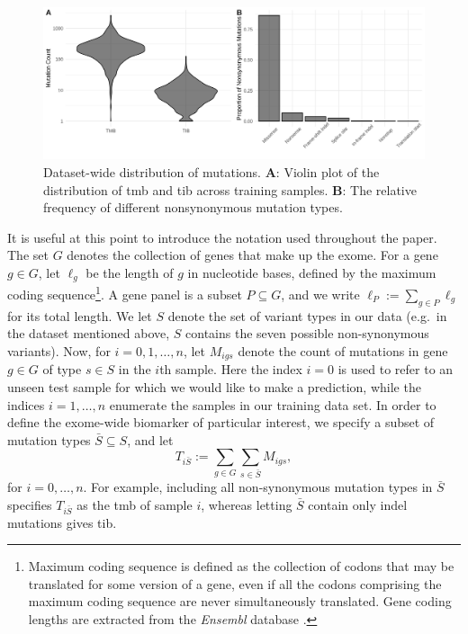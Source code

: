 \documentclass[12pt]{article}
\begin{document}
\begin{figure}[htbp]
\centering
\includegraphics[width=6in]{figures/fig2.png}
\vspace*{-5mm}
\caption{ Dataset-wide distribution of mutations. \textbf{A}: Violin plot of the distribution of \acrshort{tmb} and \acrshort{tib} across training samples. \textbf{B}: The relative frequency of different nonsynonymous mutation types. \label{fig:2}}
\vspace*{-2mm}
\end{figure}

It is useful at this point to introduce the notation used throughout the paper. The set $G$ denotes the collection of genes that make up the exome. For a gene $g \in G$, let $\ell_g$ be the length of $g$ in nucleotide bases, defined by the maximum coding sequence\footnote{Maximum coding sequence is defined as the collection of codons that may be translated for some version of a gene, even if all the codons comprising the maximum coding sequence are never simultaneously translated. Gene coding lengths are extracted from the \emph{Ensembl} database \citep{yates_ensembl_2020}.}.  A gene panel is a subset $P \subseteq G$, and we write $\ell_P := \sum_{g \in P} \ell_g$ for its total length. We let $S$ denote the set of variant types in our data (e.g.~in the dataset mentioned above, $S$ contains the seven possible non-synonymous variants). Now, for $i = 0, 1, \ldots, n$, let $M_{igs}$ denote the count of mutations in gene $g \in G$ of type $s \in S$ in the $i$th sample. Here the index $i=0$ is used to refer to an unseen test sample for which we would like to make a prediction, while the indices $i=1,\ldots,n$ enumerate the samples in our training data set.  In order to define the exome-wide biomarker of particular interest, we specify a subset of mutation types $\bar{S} \subseteq S$, and let
\begin{equation}
T_{i\bar{S}} := \sum_{g \in G} \sum_{s \in \bar{S}} M_{igs},
\label{eq:biomarker}
\end{equation}
for $i=0,\ldots, n$.
% 
For example, including all non-synonymous mutation types in $\bar{S}$ specifies $T_{i\bar{S}}$ as the \acrshort{tmb} of sample $i$, whereas letting $\bar{S}$ contain only indel mutations gives \acrshort{tib}. 
\end{document}

